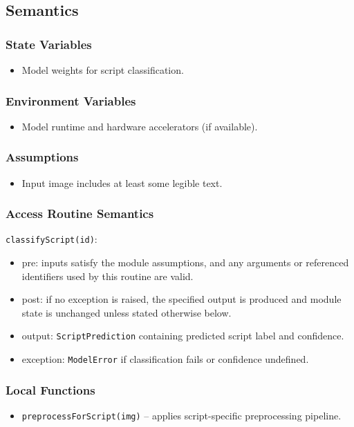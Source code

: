 \documentclass[12pt, titlepage]{article}
\begin{document}
\subsection{Semantics}

\subsubsection{State Variables}
\begin{itemize}
    \item Model weights for script classification.
\end{itemize}

\subsubsection{Environment Variables}
\begin{itemize}
    \item Model runtime and hardware accelerators (if available).
\end{itemize}

\subsubsection{Assumptions}
\begin{itemize}
    \item Input image includes at least some legible text.
\end{itemize}

\subsubsection{Access Routine Semantics}

\noindent \texttt{classifyScript(id)}:
\begin{itemize}
    \item pre: inputs satisfy the module assumptions, and any arguments or referenced identifiers used by this routine are valid.
    \item post: if no exception is raised, the specified output is produced and module state is unchanged unless stated otherwise below.
    \item output: \texttt{ScriptPrediction} containing predicted script label and confidence.
    \item exception: \texttt{ModelError} if classification fails or confidence undefined.
\end{itemize}

\subsubsection{Local Functions}
\begin{itemize}
    \item \texttt{preprocessForScript(img)} – applies script-specific preprocessing pipeline.
\end{itemize}
\end{document}
